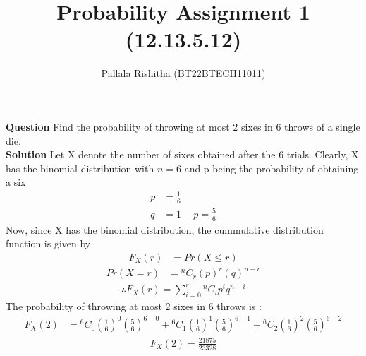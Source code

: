 \documentclass[12pt,twocolumn,notitlepage]{article}
\title{Probability Assignment 1 (12.13.5.12)}
\author{Pallala Rishitha (BT22BTECH11011)}
\date{}
\providecommand{\brak}[1]{\ensuremath{\left(#1\right)}}
\newcommand*{\comb}[2]{{}^{#1}C_{#2}}
\begin{document}
\maketitle
\textbf{Question}
Find the probability of throwing at most 2 sixes in 6 throws of a single die.\\
\textbf{Solution}
Let X denote the number of sixes obtained after the 6 trials. Clearly, X has the binomial distribution with $n=6$ and p being the probability of obtaining a six
\begin{align}
    p &= \frac{1}{6} \\ 
    q &=1-p = \frac{5}{6}     
\end{align}
Now, since X has the binomial distribution, the cummulative distribution function is given by
\begin{align}
    F_X\brak{r} &= Pr\brak{X \le r}
\end{align}
\begin{align}
 Pr\brak{X=r} &= \comb{n}{r}\brak{p}^{r}\brak{q}^{n-r} 
\end{align}
\begin{align}
    \therefore   F_X(r)=\sum_{i=0}^r\comb{n}{i}p^iq^{n-i}
\end{align}
The probability of throwing at most 2 sixes in 6 throws is :
\begin{align}
 F_X\brak{2} &= \comb{6}{0}\brak{\frac{1}{6}}^{0}\brak{\frac{5}{6}}^{6-0} +\comb{6}{1}\brak{\frac{1}{6}}^{1}\brak{\frac{5}{6}}^{6-1} + \comb{6}{2}\brak{\frac{1}{6}}^{2}\brak{\frac{5}{6}}^{6-2}
\end{align}
\begin{align}
  F_X\brak{2}   = \frac{21875}{23328} 
\end{align}
\end{document}
